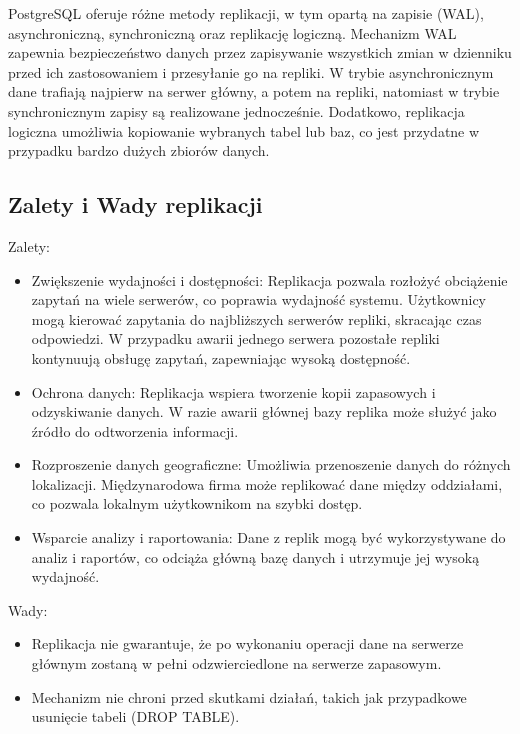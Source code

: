 \documentclass[a4paper,11pt,openany,english]{sphinxmanual}
\begin{document}
\sphinxAtStartPar
PostgreSQL oferuje różne metody replikacji, w tym opartą na zapisie (WAL), asynchroniczną, synchroniczną oraz replikację logiczną. Mechanizm WAL zapewnia bezpieczeństwo danych przez zapisywanie wszystkich zmian w dzienniku przed ich zastosowaniem i przesyłanie go na repliki. W trybie asynchronicznym dane trafiają najpierw na serwer główny, a potem na repliki, natomiast w trybie synchronicznym zapisy są realizowane jednocześnie. Dodatkowo, replikacja logiczna umożliwia kopiowanie wybranych tabel lub baz, co jest przydatne w przypadku bardzo dużych zbiorów danych.


\subsection{Zalety i Wady replikacji}
\label{\detokenize{rozdzial2/index:zalety-i-wady-replikacji}}
\sphinxAtStartPar
Zalety:
\begin{itemize}
\item {} 
\sphinxAtStartPar
Zwiększenie wydajności i dostępności: Replikacja pozwala rozłożyć obciążenie zapytań na wiele serwerów, co poprawia wydajność systemu. Użytkownicy mogą kierować zapytania do najbliższych serwerów repliki, skracając czas odpowiedzi. W przypadku awarii jednego serwera pozostałe repliki kontynuują obsługę zapytań, zapewniając wysoką dostępność.

\item {} 
\sphinxAtStartPar
Ochrona danych: Replikacja wspiera tworzenie kopii zapasowych i odzyskiwanie danych. W razie awarii głównej bazy replika może służyć jako źródło do odtworzenia informacji.

\item {} 
\sphinxAtStartPar
Rozproszenie danych geograficzne: Umożliwia przenoszenie danych do różnych lokalizacji. Międzynarodowa firma może replikować dane między oddziałami, co pozwala lokalnym użytkownikom na szybki dostęp.

\item {} 
\sphinxAtStartPar
Wsparcie analizy i raportowania: Dane z replik mogą być wykorzystywane do analiz i raportów, co odciąża główną bazę danych i utrzymuje jej wysoką wydajność.

\end{itemize}

\sphinxAtStartPar
Wady:
\begin{itemize}
\item {} 
\sphinxAtStartPar
Replikacja nie gwarantuje, że po wykonaniu operacji dane na serwerze głównym zostaną w pełni odzwierciedlone na serwerze zapasowym.

\item {} 
\sphinxAtStartPar
Mechanizm nie chroni przed skutkami działań, takich jak przypadkowe usunięcie tabeli (DROP TABLE).

\end{itemize}
\end{document}
